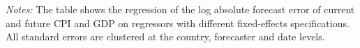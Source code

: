 \begin{table}[H]
{\begin{tabularx}{\linewidth}{l C C C C C C C C}
\end{tabularx}
\begin{flushleft}
\footnotesize \begin{minipage}{1\textwidth} \vspace{-10pt} \begin{tabnote} \textit{Notes:}   The table shows the regression of the log absolute forecast error of current and future CPI and GDP on regressors with different fixed-effects specifications. All standard errors are clustered at the country, forecaster and date levels. \end{tabnote} \end{minipage}  
\end{flushleft}
}
\end{table}
